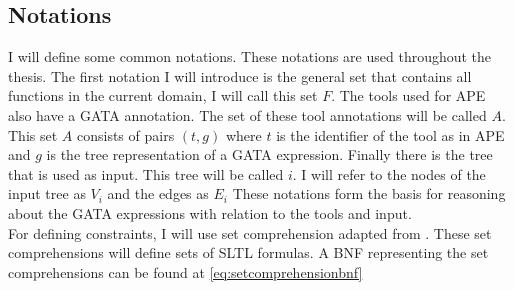 \documentclass{article}
\begin{document}



\subsection{Notations}

I will define some common notations. These notations are used throughout the thesis. The first notation I will introduce is the general set that contains all functions in the current domain, I will call this set $F$. The tools used for APE also have a GATA annotation. The set of these tool annotations will be called $A$. This set $A$ consists of pairs $(t,g)$ where $t$ is the identifier of the tool as in APE and $g$ is the tree representation of a GATA expression. Finally there is the tree that is used as input. This tree will be called $i$. I will refer to the nodes of the input tree as $V_i$ and the edges as $E_i$ These notations form the basis for reasoning about the GATA expressions with relation to the tools and input.
\\

For defining constraints, I will use set comprehension adapted from \cite{veanes2008bounded}. These set comprehensions will define sets of SLTL formulas. A BNF representing the set comprehensions can be found at \ref{eq:setcomprehensionbnf}
\end{document}
